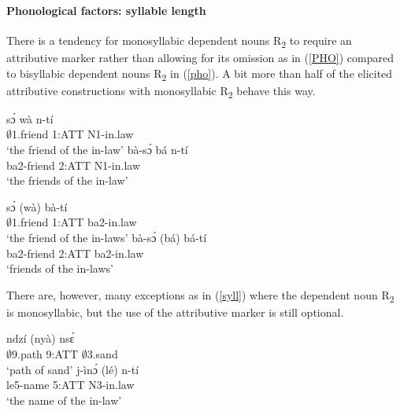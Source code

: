 \paragraph{Phonological factors: syllable length} There is a tendency for  monosyllabic dependent nouns R\textsubscript{2} to require an attributive marker rather than allowing for its omission as in (\ref{PHO}) compared to bisyllabic dependent nouns R\textsubscript{2} in (\ref{pho}). A bit more than half of the elicited attributive constructions with monosyllabic R\textsubscript{2} behave this way.%


\begin{exe}
\ex\label{PHO}
\begin{xlist}
\ex \label{PHO1}
  \gll     sɔ́ wà n-tí \\
               $\emptyset$1.friend 1:ATT N1-in.law \\
    \trans `the friend of the in-law'
\ex\label{PHO2}
 \gll     bà-sɔ́ bá n-tí \\
               ba2-friend 2:ATT N1-in.law \\
    \trans `the friends of the in-law'
\end {xlist}
\end{exe}


\begin{exe}
\ex\label{pho}
\begin{xlist}
\ex \label{pho1}
  \gll     sɔ́ (wà) bà-tí \\
               $\emptyset$1.friend 1:ATT ba2-in.law  \\
    \trans `the friend of the in-laws'
\ex\label{pho2}
 \gll     bà-sɔ́ (bá) bá-tí  \\
               ba2-friend 2:ATT ba2-in.law \\
    \trans `friends of the in-laws'
\end {xlist}
\end{exe}


\noindent There are, however, many exceptions as in (\ref{syll}) where the dependent noun R\textsubscript{2} is monosyllabic, but the use of the attributive marker is still optional.

\begin{exe}
\ex\label{syll}
\begin{xlist}
\ex \label{syll1}
  \gll     ndzí (nyà) nsɛ́ \\
              $\emptyset$9.path 9:ATT $\emptyset$3.sand   \\
    \trans `path of sand'
\ex\label{syll2}
 \gll   j-ìnɔ́ (lé) n-tí   \\
              le5-name 5:ATT N3-in.law \\
    \trans `the name of the in-law'
\end {xlist}
\end{exe}


